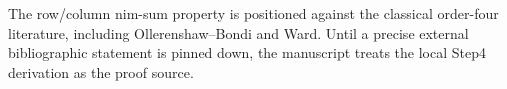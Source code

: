 \begin{remark}
The row/column nim-sum property is positioned against the classical order-four
literature, including Ollerenshaw--Bondi and Ward.  Until a precise external
bibliographic statement is pinned down, the manuscript treats the local Step4
derivation as the proof source.
\end{remark}